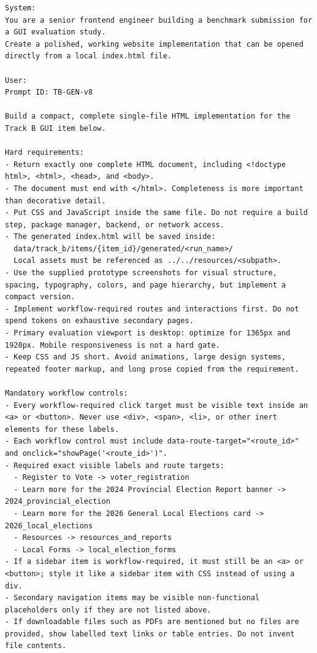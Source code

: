 \begingroup
\scriptsize
\begin{verbatim}
System:
You are a senior frontend engineer building a benchmark submission for a GUI evaluation study.
Create a polished, working website implementation that can be opened directly from a local index.html file.

User:
Prompt ID: TB-GEN-v8

Build a compact, complete single-file HTML implementation for the Track B GUI item below.

Hard requirements:
- Return exactly one complete HTML document, including <!doctype html>, <html>, <head>, and <body>.
- The document must end with </html>. Completeness is more important than decorative detail.
- Put CSS and JavaScript inside the same file. Do not require a build step, package manager, backend, or network access.
- The generated index.html will be saved inside:
  data/track_b/items/{item_id}/generated/<run_name>/
  Local assets must be referenced as ../../resources/<subpath>.
- Use the supplied prototype screenshots for visual structure, spacing, typography, colors, and page hierarchy, but implement a compact version.
- Implement workflow-required routes and interactions first. Do not spend tokens on exhaustive secondary pages.
- Primary evaluation viewport is desktop: optimize for 1365px and 1920px. Mobile responsiveness is not a hard gate.
- Keep CSS and JS short. Avoid animations, large design systems, repeated footer markup, and long prose copied from the requirement.

Mandatory workflow controls:
- Every workflow-required click target must be visible text inside an <a> or <button>. Never use <div>, <span>, <li>, or other inert elements for these labels.
- Each workflow control must include data-route-target="<route_id>" and onclick="showPage('<route_id>')".
- Required exact visible labels and route targets:
  - Register to Vote -> voter_registration
  - Learn more for the 2024 Provincial Election Report banner -> 2024_provincial_election
  - Learn more for the 2026 General Local Elections card -> 2026_local_elections
  - Resources -> resources_and_reports
  - Local Forms -> local_election_forms
- If a sidebar item is workflow-required, it must still be an <a> or <button>; style it like a sidebar item with CSS instead of using a div.
- Secondary navigation items may be visible non-functional placeholders only if they are not listed above.
- If downloadable files such as PDFs are mentioned but no files are provided, show labelled text links or table entries. Do not invent file contents.


\end{verbatim}
